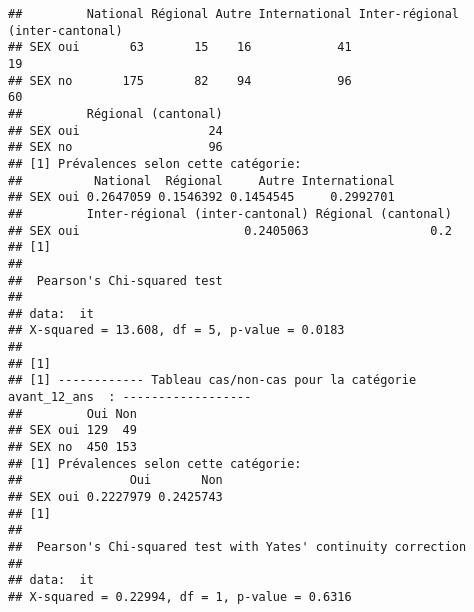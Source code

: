 \documentclass[
]{article}
\begin{document}
\begin{verbatim}
##         National Régional Autre International Inter-régional (inter-cantonal)
## SEX oui       63       15    16            41                              19
## SEX no       175       82    94            96                              60
##         Régional (cantonal)
## SEX oui                  24
## SEX no                   96
## [1] Prévalences selon cette catégorie:
##          National  Régional     Autre International
## SEX oui 0.2647059 0.1546392 0.1454545     0.2992701
##         Inter-régional (inter-cantonal) Régional (cantonal)
## SEX oui                       0.2405063                 0.2
## [1] 
## 
##  Pearson's Chi-squared test
## 
## data:  it
## X-squared = 13.608, df = 5, p-value = 0.0183
## 
## [1] 
## [1] ------------ Tableau cas/non-cas pour la catégorie  avant_12_ans  : ------------------
##         Oui Non
## SEX oui 129  49
## SEX no  450 153
## [1] Prévalences selon cette catégorie:
##               Oui       Non
## SEX oui 0.2227979 0.2425743
## [1] 
## 
##  Pearson's Chi-squared test with Yates' continuity correction
## 
## data:  it
## X-squared = 0.22994, df = 1, p-value = 0.6316
\end{verbatim}
\end{document}

